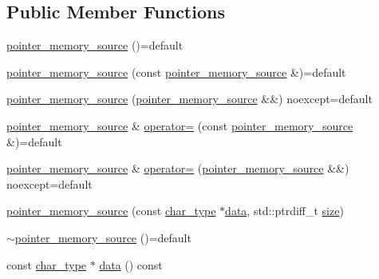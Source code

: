 \subsection*{Public Member Functions}
\begin{DoxyCompactItemize}
\item 
\mbox{\hyperlink{classirk_1_1pointer__memory__source_a30f9b1ac20116068b5e9daf8597f4f4b}{pointer\+\_\+memory\+\_\+source}} ()=default
\item 
\mbox{\hyperlink{classirk_1_1pointer__memory__source_a8d511fd23cef776e3609534cffa9c872}{pointer\+\_\+memory\+\_\+source}} (const \mbox{\hyperlink{classirk_1_1pointer__memory__source}{pointer\+\_\+memory\+\_\+source}} \&)=default
\item 
\mbox{\hyperlink{classirk_1_1pointer__memory__source_a72e864216e39308741c8d516a5575fe2}{pointer\+\_\+memory\+\_\+source}} (\mbox{\hyperlink{classirk_1_1pointer__memory__source}{pointer\+\_\+memory\+\_\+source}} \&\&) noexcept=default
\item 
\mbox{\hyperlink{classirk_1_1pointer__memory__source}{pointer\+\_\+memory\+\_\+source}} \& \mbox{\hyperlink{classirk_1_1pointer__memory__source_a1eb99c944e47711d04d7472723c6132d}{operator=}} (const \mbox{\hyperlink{classirk_1_1pointer__memory__source}{pointer\+\_\+memory\+\_\+source}} \&)=default
\item 
\mbox{\hyperlink{classirk_1_1pointer__memory__source}{pointer\+\_\+memory\+\_\+source}} \& \mbox{\hyperlink{classirk_1_1pointer__memory__source_a5d982b5fbaefd34ffbf5644ccb8d55d0}{operator=}} (\mbox{\hyperlink{classirk_1_1pointer__memory__source}{pointer\+\_\+memory\+\_\+source}} \&\&) noexcept=default
\item 
\mbox{\hyperlink{classirk_1_1pointer__memory__source_aa38280782ca73eece43d895b7ce12687}{pointer\+\_\+memory\+\_\+source}} (const \mbox{\hyperlink{classirk_1_1pointer__memory__source_a4b778df8efee229fdafbd4de413dbf61}{char\+\_\+type}} $\ast$\mbox{\hyperlink{classirk_1_1pointer__memory__source_a563d794f484d7e6812714e4fe23bcd08}{data}}, std\+::ptrdiff\+\_\+t \mbox{\hyperlink{classirk_1_1pointer__memory__source_a6eafc7470d86718ade875dcd87439a2b}{size}})
\item 
\mbox{\hyperlink{classirk_1_1pointer__memory__source_a3d263637827d034a1dae482f02e487b5}{$\sim$pointer\+\_\+memory\+\_\+source}} ()=default
\item 
const \mbox{\hyperlink{classirk_1_1pointer__memory__source_a4b778df8efee229fdafbd4de413dbf61}{char\+\_\+type}} $\ast$ \mbox{\hyperlink{classirk_1_1pointer__memory__source_a563d794f484d7e6812714e4fe23bcd08}{data}} () const

\end{DoxyCompactItemize}
